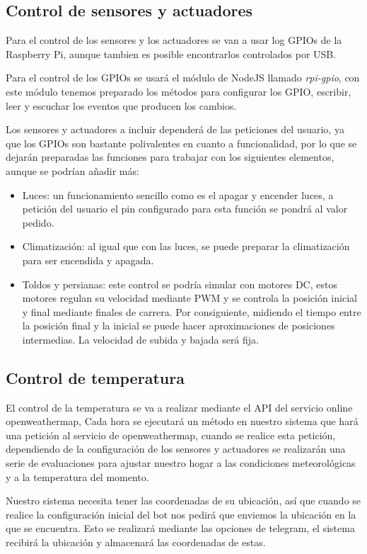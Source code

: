 \documentclass[10pt,journal,compsoc]{IEEEtran}
\begin{document}
\subsection{Control de sensores y actuadores}
Para el control de los sensores y los actuadores se van a usar log GPIOs de la 
Raspberry Pi, aunque tambien es posible encontrarlos controlados por USB.

Para el control de los GPIOs se usará el módulo de NodeJS llamado 
\textit{rpi-gpio}, con este módulo tenemos preparado los métodos para configurar 
los GPIO, escribir, leer y escuchar los eventos que producen los cambios.

Los sensores y actuadores a incluir dependerá de las peticiones del usuario, ya 
que los GPIOs son bastante polivalentes en cuanto a funcionalidad, por lo que se 
dejarán preparadas las funciones para trabajar con los siguientes elementos, 
aunque se podrían añadir más:

\begin{itemize}
  \item Luces: un funcionamiento sencillo como es el apagar y encender luces, a 
  petición del usuario el pin configurado para esta función se pondrá al valor 
  pedido.
  \item Climatización: al igual que con las luces, se puede preparar la 
  climatización para ser encendida y apagada.
  \item Toldos y persianas: este control se podría simular con motores DC, estos 
  motores regulan su velocidad mediante PWM y se controla la posición inicial y 
  final mediante finales de carrera. 
  Por consiguiente, midiendo el tiempo entre la 
  posición final y la inicial se puede hacer aproximaciones de posiciones 
  intermedias. La velocidad de subida y bajada será fija.
\end{itemize}

\subsection{Control de temperatura}
El control de la temperatura se va a realizar mediante el API del servicio online openweathermap, 
Cada hora se ejecutará un método en nuestro sistema que hará una petición al 
servicio de openweathermap, cuando se realice esta petición, dependiendo de la 
configuración de los sensores y actuadores se realizarán una serie de 
evaluaciones para ajustar nuestro hogar a las condiciones meteorológicas y a la 
temperatura del momento.

Nuestro sistema necesita tener las coordenadas de su ubicación, así que cuando 
se realice la configuración inicial del bot nos pedirá que enviemos la ubicación 
en la que se encuentra. Esto se realizará mediante las opciones de telegram, el 
sistema recibirá la ubicación y almacenará las coordenadas de estas.
\end{document}
